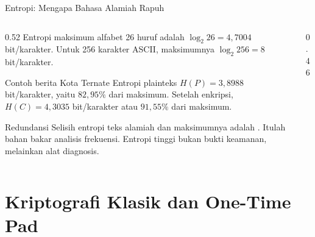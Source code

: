 \documentclass[aspectratio=169,11pt]{beamer}
\begin{document}
\begin{frame}{Entropi: Mengapa Bahasa Alamiah Rapuh}
    \begin{columns}[T,onlytextwidth]
        \begin{column}{0.52\textwidth}
            \footnotesize
            Entropi maksimum alfabet 26 huruf adalah
            $\log_2 26 = 4{,}7004$ bit/karakter. Untuk 256 karakter ASCII,
            maksimumnya $\log_2 256 = 8$ bit/karakter.
            \vspace{0.12cm}
            \begin{exampleblock}{Contoh berita Kota Ternate}
                Entropi plainteks $H(P)=3{,}8988$ bit/karakter, yaitu
                $82{,}95\%$ dari maksimum. Setelah enkripsi,
                $H(C)=4{,}3035$ bit/karakter atau $91{,}55\%$ dari maksimum.
            \end{exampleblock}
            \begin{alertblock}{Redundansi}
                Selisih entropi teks alamiah dan maksimumnya adalah
                . Itulah bahan bakar analisis frekuensi.
                Entropi tinggi bukan bukti keamanan, melainkan alat diagnosis.
            \end{alertblock}
        \end{column}
        \begin{column}{0.46\textwidth}
            \centering
        \end{column}
    \end{columns}
\end{frame}

\section{Kriptografi Klasik dan One-Time Pad}
\end{document}

